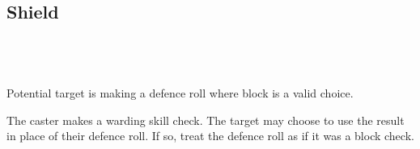 \subsection*{Shield}
 \\
 \\
 \\
{
    Potential target is making a defence roll where block is a valid choice.
} \\

The caster makes a warding skill check. The target may choose to use the result
in place of their defence roll. If so, treat the defence roll as if it was a
block check.
